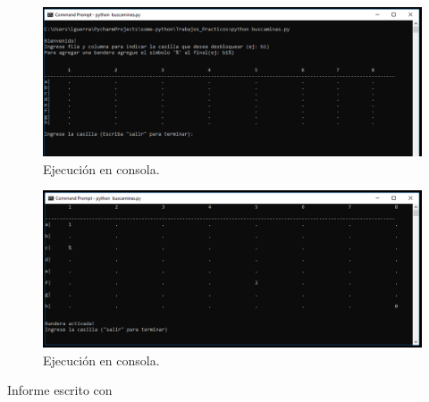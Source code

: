 \documentclass{article}
\begin{document}
\begin{figure}[hbt!]
	\center
	\includegraphics[width=1\textwidth]{img/ejecucion_cmd.PNG}
	\caption{
	\label{fig:my-label} Ejecuci\'on en consola. }
\end{figure}

\begin{figure}[hbt!]
	\center
	\includegraphics[width=1\textwidth]{img/ejecucion_cmd2.PNG}
	\caption{
	\label{fig:my-label} Ejecuci\'on en consola. }
\end{figure}


\begin{flushright}
	Informe escrito con \Ovalbox{\bf \LaTeX}
\end{flushright}
\end{document}
